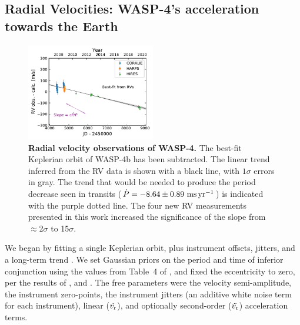 \documentclass[12pt,twocolumn,tighten]{aastex62}
\begin{document}
\subsection{Radial Velocities: WASP-4's acceleration towards the Earth}

\begin{figure}[t]
	\begin{center}
		\leavevmode
		\includegraphics[width=0.5\textwidth]{f2.pdf}
	\end{center}
	\vspace{-0.7cm}
	\caption{
    {\bf Radial velocity observations of WASP-4.} The best-fit Keplerian orbit
    of WASP-4b has been subtracted.  The linear trend inferred from the
    RV data is shown with a black line, with $1\sigma$ errors in gray.
    The trend that would be needed to produce the period decrease seen
    in transits ($\dot{P}= - 8.64 \pm 0.89~{\rm ms}\,{\rm yr}^{-1}$) is
    indicated with the purple dotted line.  The four new RV
    measurements presented in this work increased the significance of
    the slope from $\approx$2$\sigma$ to 15$\sigma$.
	\label{fig:rvs}
  \vspace{-0.3cm}
	}
\end{figure}

We began by fitting a single Keplerian orbit, plus instrument offsets,
jitters, and a long-term trend
\citep[][\texttt{radvel}]{fulton_radvel_2018}.  We set Gaussian priors
on the period and time of inferior conjunction using the values from
Table~4 of , and fixed the eccentricity
to zero, per the results of \citet{beerer_secondary_2011},
\citet{knutson_friends_2014} and \citet{bonomo_gaps_2017}.  The free
parameters were the velocity semi-amplitude, the instrument
zero-points, the instrument jitters (an additive white noise term for
each instrument), linear ($\dot{v_{\rm r}}$), and optionally
second-order ($\ddot{v_{\rm r}}$) acceleration terms.
\end{document}
